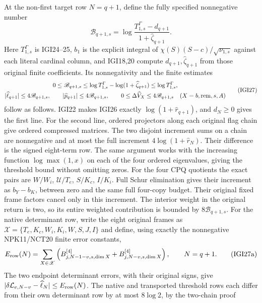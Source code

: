 \documentclass[11pt,a4paper]{article}
\begin{document}
At the non-first target row $N=q+1$, define the fully specified
nonnegative number
\[
 \mathscr B_{q+1,s}=
   \log\frac{T_{1,s}^\Gamma-d_{q+1}}
                   {1+\widehat\zeta_{q+1}}.
                                                               \tag{IGI26}
\]
Here $T_{1,s}^\Gamma$ is IGI24--25, $b_1$ is the explicit integral
of $\chi(S)(S-c)/\sqrt{\nu_{1,s}}$ against each literal cardinal
column, and IGI18,20 compute $d_{q+1},\widehat\zeta_{q+1}$
from those original finite coefficients. Its nonnegativity and
the finite estimates
\[
\begin{gathered}
 0\le\mathscr B_{q+1,s}\le
      \log T_{1,s}^\Gamma-\log(1+\widehat\zeta_{q+1})
      \le\log T_{1,s}^\Gamma,\\
 |\widehat\ell_{q+1}|\le4\mathscr B_{q+1,s},\qquad
 |\widehat p_{q+1}|\le4\mathscr B_{q+1,s},\qquad
 0\le\Delta\widehat V_X\le4\mathscr B_{q+1,s}
                    \quad(X=b,{\rm rem},s,A)
\end{gathered}                                                    \tag{IGI27}
\]
follow as follows. IGI22 makes IGI26 exactly
$\log(1+\widehat r_{q+1})$, and $d_N\ge0$ gives the first line.
For the second line, ordered projectors along each original flag
chain give ordered compressed matrices. The two disjoint increment
sums on a chain are nonnegative and at most the full increment
$4\log(1+\widehat r_N)$. Their difference is the signed eight-term
row. The same argument works with the increasing function
$\log\max(1,x)$ on each of the four ordered eigenvalues, giving
the threshold bound without omitting zeros. For the four CPQ
quotients the exact pairs are $W/W_i$, $\mathcal U/T_e$,
$S/K_c$, $I/K_i$. Full Schur elimination gives their increment
as $b_Y-b_K$, between zero and the same full four-copy budget.
Their original fixed frame factors cancel only in this increment.
The interior weight in the original return is two, so its entire
weighted contribution is bounded by $8\mathscr B_{q+1,s}$.
For the native determinant row, write the eight original frames
as $\mathscr X=\{T_e,K_c,W_i,K_i,W,S,J,I\}$ and define, using
exactly the nonnegative NPK11/NCT20 finite error constants,
\[
 E_{\rm row}(N)=\sum_{X\in\mathscr X}
 \left(B^{[4]}_{j,N-1-v,s,\dim X}
              +B^{[4]}_{j,N-v,s,\dim X}\right),\qquad N=q+1.
                                                               \tag{IGI27a}
\]
The two endpoint determinant errors, with their original signs,
give $|\delta\mathcal L_{e,N-v}-\widehat\ell_N|\le E_{\rm row}(N)$.
The native and transported threshold rows each differ from their
own determinant row by at most $8\log2$, by the two-chain proof
\end{document}
